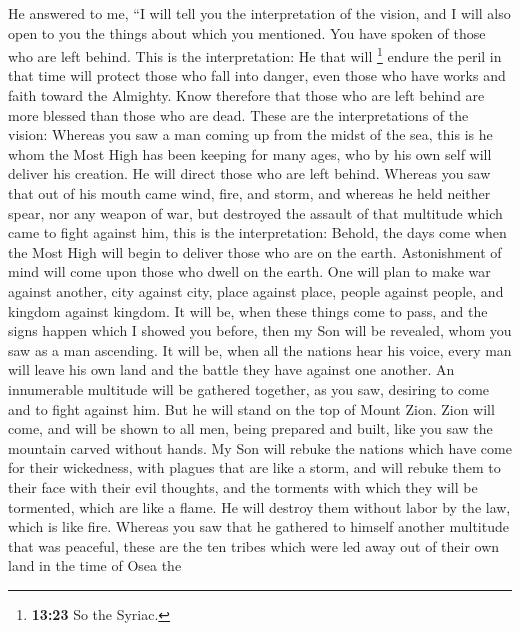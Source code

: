 He answered to me,  ``I will tell you the interpretation
of the vision, and I will also open to you the things about which you
mentioned.  You have spoken of those who are left behind.
This is the interpretation:  He that will \footnote{\textbf{13:23}
  So the Syriac.} endure the peril in that time will protect those who
fall into danger, even those who have works and faith toward the
Almighty.  Know therefore that those who are left behind
are more blessed than those who are dead.  These are the
interpretations of the vision: Whereas you saw a man coming up from the
midst of the sea,  this is he whom the Most High has been
keeping for many ages, who by his own self will deliver his creation. He
will direct those who are left behind.  Whereas you saw
that out of his mouth came wind, fire, and storm,  and
whereas he held neither spear, nor any weapon of war, but destroyed the
assault of that multitude which came to fight against him, this is the
interpretation:  Behold, the days come when the Most High
will begin to deliver those who are on the earth. 
Astonishment of mind will come upon those who dwell on the earth.
 One will plan to make war against another, city against
city, place against place, people against people, and kingdom against
kingdom.  It will be, when these things come to pass, and
the signs happen which I showed you before, then my Son will be
revealed, whom you saw as a man ascending.  It will be,
when all the nations hear his voice, every man will leave his own land
and the battle they have against one another.  An
innumerable multitude will be gathered together, as you saw, desiring to
come and to fight against him.  But he will stand on the
top of Mount Zion.  Zion will come, and will be shown to
all men, being prepared and built, like you saw the mountain carved
without hands.  My Son will rebuke the nations which have
come for their wickedness, with plagues that are like a storm,
 and will rebuke them to their face with their evil
thoughts, and the torments with which they will be tormented, which are
like a flame. He will destroy them without labor by the law, which is
like fire.  Whereas you saw that he gathered to himself
another multitude that was peaceful,  these are the ten
tribes which were led away out of their own land in the time of Osea the
